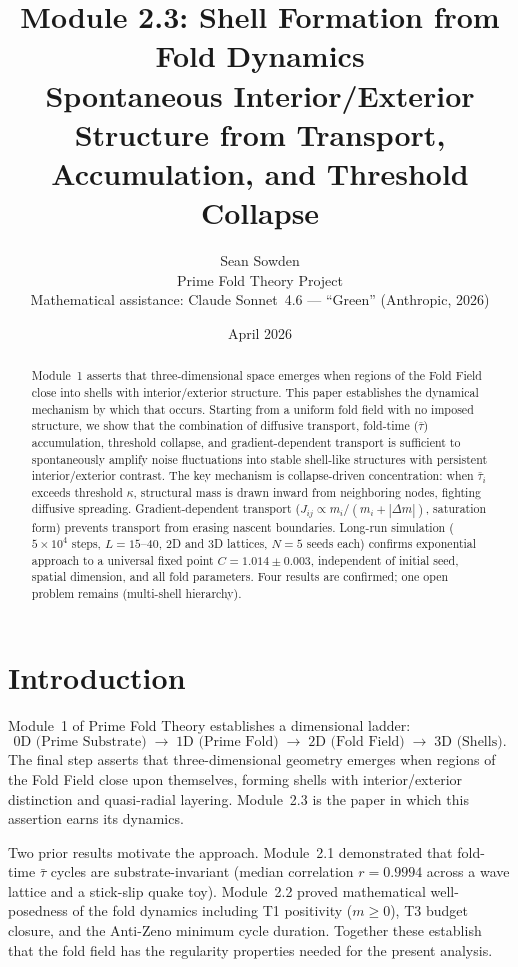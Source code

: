 \documentclass[12pt]{article}
\title{\textbf{Module 2.3: Shell Formation from Fold Dynamics}\\[4pt]
\large Spontaneous Interior/Exterior Structure from Transport,
Accumulation, and Threshold Collapse}
\author{Sean Sowden\\
\small Prime Fold Theory Project\\[4pt]
\small Mathematical assistance: Claude Sonnet~4.6 ---
``Green'' (Anthropic, 2026)}
\date{April 2026}
\newcommand{\taubar}{\bar{\tau}}
\begin{document}
\maketitle

\begin{abstract}
Module~1 asserts that three-dimensional space emerges when regions of
the Fold Field close into shells with interior/exterior structure.
This paper establishes the dynamical mechanism by which that occurs.
Starting from a uniform fold field with no imposed structure, we show
that the combination of diffusive transport, fold-time ($\taubar$)
accumulation, threshold collapse, and gradient-dependent transport
is sufficient to spontaneously amplify noise fluctuations into stable
shell-like structures with persistent interior/exterior contrast.
The key mechanism is collapse-driven concentration: when $\taubar_i$
exceeds threshold $\kappa$, structural mass is drawn inward from
neighboring nodes, fighting diffusive spreading. Gradient-dependent
transport ($J_{ij} \propto m_i/(m_i + |\Delta m|)$, saturation form) prevents
transport from erasing nascent boundaries.
Long-run simulation ($5\times10^4$ steps, $L=15$--$40$, 2D and 3D
lattices, $N=5$ seeds each) confirms exponential approach to a
universal fixed point $C = 1.014 \pm 0.003$, independent of
initial seed, spatial dimension, and all fold parameters.
Four results are confirmed; one open problem remains (multi-shell
hierarchy).\end{abstract}

\section{Introduction}

Module~1 of Prime Fold Theory establishes a dimensional ladder:
\begin{equation}
  \text{0D (Prime Substrate)}
  \;\to\; \text{1D (Prime Fold)}
  \;\to\; \text{2D (Fold Field)}
  \;\to\; \text{3D (Shells)}.
\end{equation}
The final step asserts that three-dimensional geometry emerges when
regions of the Fold Field close upon themselves, forming shells with
interior/exterior distinction and quasi-radial layering. Module~2.3
is the paper in which this assertion earns its dynamics.

Two prior results motivate the approach. Module~2.1 demonstrated
that fold-time $\taubar$ cycles are substrate-invariant (median
correlation $r = 0.9994$ across a wave lattice and a stick-slip
quake toy). Module~2.2 proved mathematical well-posedness of the
fold dynamics including T1 positivity ($m \geq 0$), T3 budget
closure, and the Anti-Zeno minimum cycle duration. Together these
establish that the fold field has the regularity properties needed
for the present analysis.
\end{document}
